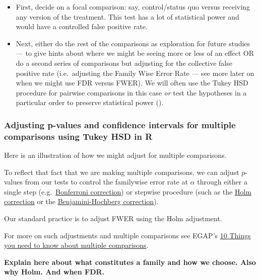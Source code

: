 \documentclass[
  12pt,
]{book}
\theoremstyle{definition}
\theoremstyle{definition}
\theoremstyle{definition}
\theoremstyle{remark}
\begin{document}
\begin{itemize}
\item
  First, decide on a focal comparison: say, control/status quo versus
  receiving any version of the treatment. This test has a lot of
  statistical power and would have a controlled false positive rate.
\item
  Next, either do the rest of the comparisons as exploration for future
  studies --- to give hints about where we might be seeing more or less
  of an effect OR do a second series of comparisons but adjusting for
  the collective false positive rate (i.e.~adjusting the Family Wise
  Error Rate --- see more later on when we might use FDR versus FWER).
  We will often use the Tukey HSD procedure for pairwise comparisons in
  this case \emph{or} test the hypotheses in a particular order to
  preserve statistical power (\citet{rosenbaum2008a}).
\end{itemize}

\hypertarget{adjusting-p-values-and-confidence-intervals-for-multiple-comparisons-using-tukey-hsd-in-r}{%
\subsubsection{Adjusting p-values and confidence intervals for multiple
comparisons using Tukey HSD in
R}\label{adjusting-p-values-and-confidence-intervals-for-multiple-comparisons-using-tukey-hsd-in-r}}

Here is an illustration of how we might adjust for multiple comparisons.

To reflect that fact that we are making multiple comparisons, we can
adjust \(p\)-values from our tests to control the familywise error rate
at \(\alpha\) through either a single step
(e.g.~\href{https://en.wikipedia.org/wiki/Bonferroni_correction}{Bonferroni
correction}) or stepwise procedure (such as the
\href{https://en.wikipedia.org/wiki/Holm\%E2\%80\%93Bonferroni_method}{Holm
correction} or the
\href{https://en.wikipedia.org/wiki/False_discovery_rate\#Benjamini.E2.80.93Hochberg_procedure}{Benjamini-Hochberg
correction}).

Our standard practice is to adjust FWER using the Holm adjustment.

For more on such adjustments and multiple comparisons see EGAP's
\href{http://egap.org/methods-guides/10-things-you-need-know-about-multiple-comparisons}{10
Things you need to know about multiple comparisons}.

\textbf{Explain here about what constitutes a family and how we choose.
Also why Holm. And when FDR.}
\end{document}

